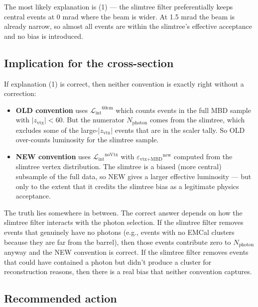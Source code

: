 \documentclass[11pt,letterpaper]{article}
\newcommand{\zvtx}{\ensuremath{z_{\mathrm{vtx}}}}
\newcommand{\Lint}{\ensuremath{\mathcal{L}_{\text{int}}}}
\newcommand{\veff}{\ensuremath{\varepsilon_{\text{vtx+MBD}}}}
\begin{document}
The most likely explanation is (1) --- the slimtree filter
preferentially keeps central events at 0 mrad where the beam is
wider. At 1.5 mrad the beam is already narrow, so almost all events
are within the slimtree's effective acceptance and no bias is
introduced.

\subsection{Implication for the cross-section}

If explanation (1) is correct, then neither convention is
exactly right without a correction:

\begin{itemize}
  \item \textbf{OLD convention} uses $\Lint^{60\text{cm}}$ which
    counts events in the full MBD sample with $|\zvtx|<60$. But the
    numerator $N_{\text{photon}}$ comes from the slimtree, which
    excludes some of the large-$|\zvtx|$ events that are in the
    scaler tally. So OLD over-counts luminosity for the slimtree
    sample.
  \item \textbf{NEW convention} uses $\Lint^{\text{noVtx}}$ with
    $\veff^{\text{new}}$ computed from the slimtree vertex
    distribution. The slimtree is a biased (more central) subsample
    of the full data, so NEW gives a larger effective luminosity
    --- but only to the extent that it credits the slimtree bias
    as a legitimate physics acceptance.
\end{itemize}

The truth lies somewhere in between. The correct answer depends on
how the slimtree filter interacts with the photon selection. If the
slimtree filter removes events that genuinely have no
photons (e.g., events with no EMCal clusters because they are far
from the barrel), then those events contribute zero to
$N_{\text{photon}}$ anyway and the NEW convention is correct. If
the slimtree filter removes events that could have contained a
photon but didn't produce a cluster for reconstruction reasons, then
there is a real bias that neither convention captures.

\subsection{Recommended action}
\end{document}
